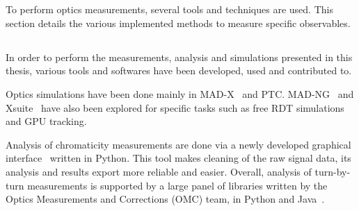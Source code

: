 \section{}
\label{section:opticcs_meas}

To perform optics measurements, several tools and techniques are used. This section details the
various implemented methods to measure specific observables.

\subsection{}

In order to perform the measurements, analysis and simulations presented in this thesis, various
tools and softwares have been developed, used and contributed to.

Optics simulations have been done mainly in MAD-X~\cite{deniau_mad-x_nodate} and PTC.
MAD-NG~\cite{deniau_mad-ng_2020} and
Xsuite~\cite{g_iadarola_xsuite_nodate} have also been explored for specific tasks such as free RDT
simulations and GPU tracking.

Analysis of chromaticity measurements are done via a newly developed graphical
interface~\cite{m_le_garrec_non-linear_2022} written in Python. This tool makes cleaning of the raw
signal data, its analysis and results export more reliable and easier.
Overall, analysis of turn-by-turn measurements is supported by a large panel of libraries written by
the Optics Measurements and Corrections (OMC) team, in Python and Java~\cite{OMC-TeamPyLHCv0.3.0}.



